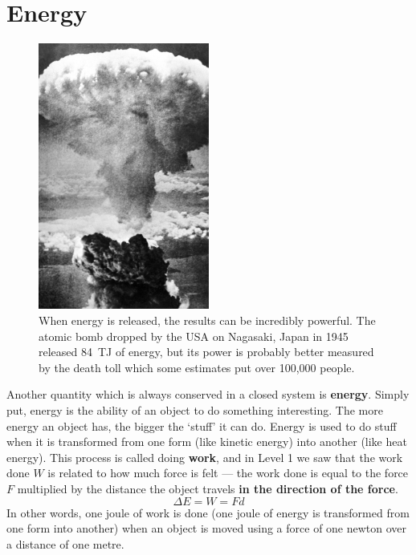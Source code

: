 \documentclass[a4paper]{amsbook}
\newcommand\capcite[1]{}
\begin{document}
\section{Energy}
\begin{figure}
  \centering
  \includegraphics[width=0.5\textwidth]{energy}
  \caption{When energy is released, the results can be incredibly powerful. The atomic bomb dropped by the USA on Nagasaki, Japan in 1945 released \SI{84}{\tera\joule} of energy, but its power is probably better measured by the death toll which some estimates put over 100,000 people. \capcite{http://cdn3-europe1.new2.ladmedia.fr/var/europe1/storage/images/media/images/nagasaki/21361791-1-fre-FR/Nagasaki_reference.jpg}\label{fig:atom}}
\end{figure}
Another quantity which is always conserved in a closed system is \textbf{energy}. Simply put, energy is the ability
of an object to do something interesting. The more energy an object has, the bigger the `stuff' it can do. Energy is
used to do stuff when it is transformed from one form (like kinetic energy) into another (like heat energy). This
process is called doing \textbf{work}, and in Level 1 we saw that the work done $ W $ is related to how much force is felt ---
the work done is equal to the force $ F $ multiplied by the distance the object travels \textbf{in the direction of the force}.
\begin{equation}
  \Delta E = W = Fd
\end{equation}
In other words, one joule of work is done (one joule of energy is transformed from one form into another) when an object
is moved using a force of one newton over a distance of one metre.
\end{document}
